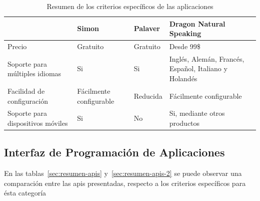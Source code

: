 \begin{table}[H]
\centering
\footnotesize
\begin{tabular}{|p{3.5cm}|p{3.5cm}|p{3.5cm}|p{3.5cm}|}
\hline
                                      &  Simon                                                       &  Palaver                                       & Dragon Natural Speaking \\
\hline
Precio                                & Gratuito                                                     & Gratuito                                       & Desde 99\$  \\
Soporte para m\'ultiples idiomas      & Si                                                           & Si                                             & Ingl\'es, Alem\'an, Franc\'es, Espa\~nol, Italiano y Holand\'es \\
Facilidad de configuraci\'on          & F\'acilmente configurable                                    & Reducida                                       & F\'acilmente configurable \\
Soporte para dispositivos m\'oviles   & Si                                                           & No                                             & Si, mediante otros productos \\
\hline
\end{tabular}
\caption{Resumen de los criterios espec\'ificos de las aplicaciones}
\label{sec:resumen-aplicaciones}
\end{table}

\subsection{Interfaz de Programaci\'on de Aplicaciones}

En las tablas~\ref{sec:resumen-apis} y~\ref{sec:resumen-apis-2} se puede observar una comparaci\'on entre las \gls{api}s presentadas, respecto a los criterios espec\'ificos
para \'esta categor\'ia


